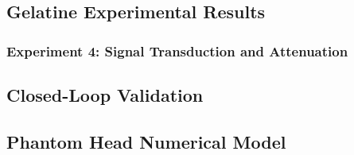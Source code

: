 \documentclass[../00_Main.tex]{subfiles}
\begin{document}
\subsection{Gelatine Experimental Results}
\label{subsec:gelatine_experiments}


\subsubsection{Experiment 4: Signal Transduction and Attenuation}
\label{subsec:signal_transduction_results}


\subsection{Closed-Loop Validation}
\label{subsec:closed_loop_validation}



\subsection{Phantom Head Numerical Model}
\label{subsec:phantom_head_numerical_model}


\biblio %
\end{document}
